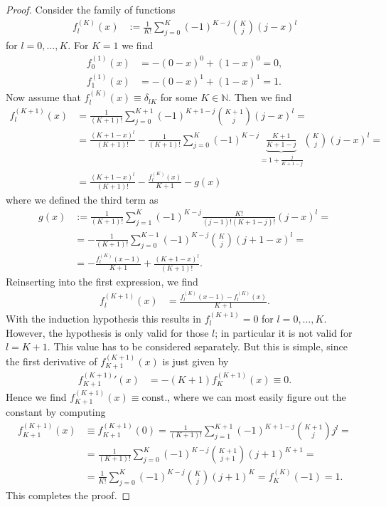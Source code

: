 \documentclass[english, parskip=full]{scrartcl}
\newcommand{\tecxt}{}
\begin{document}
\begin{proof}
Consider the family of functions
\begin{align}
f_l^{(K)}(x) &:= \frac{1}{K!} \sum_{j=0}^K (-1)^{K-j}\binom{K}{j}(j - x)^l
\end{align}
for $l=0,\dots,K$.
For $K=1$ we find
\begin{align}
f_0^{(1)}(x) &= -(0-x)^0 + (1-x)^0 = 0,\\
f_1^{(1)}(x) &= -(0-x)^1 + (1-x)^1 = 1.
\end{align}
Now assume that $f_l^{(K)} (x) \equiv \delta_{lK}$ for some $K\in\mathbb{N}$.
Then we find
\begin{align}
f_l^{(K+1)} (x) &= \frac{1}{(K+1)!} \sum_{j=0}^{K+1} (-1)^{K+1-j} \binom{K+1}{j} (j-x)^l = \\
&= \frac{(K+1-x)^l}{(K+1)!} - \frac{1}{(K+1)!} \sum_{j=0}^{K} (-1)^{K-j} \underbrace{\frac{K+1}{K+1-j}}_{=1 + \frac{j}{K+1-j}} \binom{K}{j} (j-x)^l = \\
&= \frac{(K+1-x)^l}{(K+1)!} - \frac{f_l^{(K)}(x)}{K+1} - g(x)
\end{align}
where we defined the third term as
\begin{align}
g(x) &:= \frac{1}{(K+1)!}\sum_{j=1}^K (-1)^{K-j} \frac{K!}{(j-1)!(K+1-j)!}(j-x)^l = \\
&= -\frac{1}{(K+1)!}\sum_{j=0}^{K-1} (-1)^{K-j} \binom{K}{j}(j+1-x)^l = \\
&= -\frac{f_l^{(K)}(x-1)}{K+1} + \frac{(K+1-x)^l}{(K+1)!}.
\end{align}
Reinserting into the first expression, we find
\begin{align}
f_l^{(K+1)}(x) &= \frac{f_l^{(K)}(x-1) - f_l^{(K)}(x)}{K+1}.
\end{align}
With the induction hypothesis this results in $f_l^{(K+1)} = 0$ for $l=0,\dots,K$.
However, the hypothesis is only valid for those $l$; in particular it is not valid for $l=K+1$.
This value has to be considered separately.
But this is simple, since the first derivative of $f_{K+1}^{(K+1)}(x)$ is just given by
\begin{align}
{f_{K+1}^{(K+1)}}'(x) &= -(K+1)f_{K}^{(K+1)}(x) \equiv 0.
\end{align}
Hence we find $f_{K+1}^{(K+1)}(x) \equiv \tecxt\text{const.}$, where we can most easily figure out the constant by computing
\begin{align}
f_{K+1}^{(K+1)}(x) &\equiv f_{K+1}^{(K+1)}(0) = \frac{1}{(K+1)!}\sum_{j=1}^{K+1} (-1)^{K+1-j}\binom{K+1}{j} j^l = \\
&= \frac{1}{(K+1)!}\sum_{j=0}^K (-1)^{K-j} \binom{K+1}{j+1} (j+1)^{K+1} = \\
&= \frac{1}{K!}\sum_{j=0}^K (-1)^{K-j} \binom{K}{j} (j+1)^{K} = f_K^{(K)}(-1) = 1.
\end{align}
This completes the proof.
\end{proof}
\end{document}

